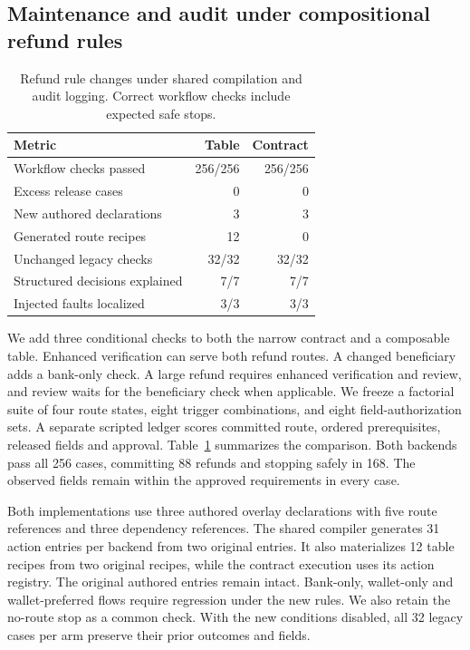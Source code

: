 \subsection{Maintenance and audit under compositional refund rules}
\label{sec:refund-maintenance}
\begin{table}[t]
\centering
\small
\begin{tabular}{@{}lrr@{}}
\toprule
Metric & Table & Contract \\
\midrule
Workflow checks passed & 256/256 & 256/256 \\
Excess release cases & 0 & 0 \\
New authored declarations & 3 & 3 \\
Generated route recipes & 12 & 0 \\
Unchanged legacy checks & 32/32 & 32/32 \\
Structured decisions explained & 7/7 & 7/7 \\
Injected faults localized & 3/3 & 3/3 \\
\bottomrule
\end{tabular}
\caption{Refund rule changes under shared compilation and audit logging. Correct workflow checks include expected safe stops.}
\label{tab:refund-rule-maintenance}
\end{table}

We add three conditional checks to both the narrow contract and a composable table. Enhanced verification can serve both refund routes. A changed beneficiary adds a bank-only check. A large refund requires enhanced verification and review, and review waits for the beneficiary check when applicable. We freeze a factorial suite of four route states, eight trigger combinations, and eight field-authorization sets. A separate scripted ledger scores committed route, ordered prerequisites, released fields and approval. Table~\ref{tab:refund-rule-maintenance} summarizes the comparison. Both backends pass all 256 cases, committing 88 refunds and stopping safely in 168. The observed fields remain within the approved requirements in every case.

Both implementations use three authored overlay declarations with five route references and three dependency references. The shared compiler generates 31 action entries per backend from two original entries. It also materializes 12 table recipes from two original recipes, while the contract execution uses its action registry. The original authored entries remain intact. Bank-only, wallet-only and wallet-preferred flows require regression under the new rules. We also retain the no-route stop as a common check. With the new conditions disabled, all 32 legacy cases per arm preserve their prior outcomes and fields.

